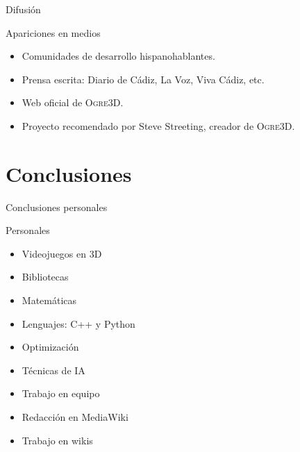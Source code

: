 \documentclass[green]{beamer}
\begin{document}
\begin{frame}{Difusión}

    \begin{block}{Apariciones en medios}
	\begin{itemize}
	\item Comunidades de desarrollo hispanohablantes.
	\item Prensa escrita: Diario de Cádiz, La Voz, Viva Cádiz, etc.
	\item Web oficial de \textsc{Ogre3D}.
	\item Proyecto recomendado por Steve Streeting, creador de \textsc{Ogre3D}.
	\end{itemize}
    \end{block}
\end{frame}

\section{Conclusiones}

\begin{frame}{Conclusiones personales}
    \begin{block}{Personales}
	\begin{itemize}
	    \item Videojuegos en 3D
	    \item Bibliotecas
	    \item Matemáticas
	    \item Lenguajes: C++ y Python
	    \item Optimización
	    \item Técnicas de IA
	    \item Trabajo en equipo
	    \item Redacción en MediaWiki
	    \item Trabajo en wikis
	\end{itemize}
    \end{block}
\end{frame}
\end{document}

